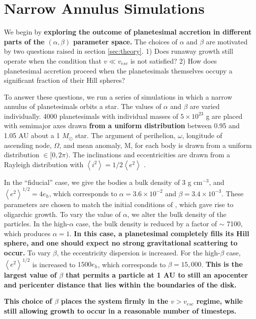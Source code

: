 \documentclass[twocolumn,linenumbers]{aastex63}
\begin{document}
\section{Narrow Annulus Simulations}\label{sec:narrow}

We begin by 
\textbf{exploring the outcome of planetesimal accretion in different parts of the $\left( \alpha, \beta \right)$
parameter space.} The choices of $\alpha$ and $\beta$ are motivated by two questions raised in section \ref{sec:theory}. 1) Does
runaway growth still operate when the condition that $v \ll v_{esc}$
is not satisfied? 2) How does planetesimal accretion proceed when the planetesimals themselves occupy a significant fraction of 
their Hill spheres?

To answer these questions, we run a series of simulations in which a
narrow annulus of planetesimals orbits a star. The values of $\alpha$
and $\beta$ are varied individually. 4000 planetesimals with
individual masses of $5 \times 10^{23}$ g are placed with semimajor
axes drawn \textbf{from a uniform distribution} between 0.95 and 1.05 AU about a 1 $M_{\odot}$
star. The argument of perihelion, $\omega$, longitude of ascending node,
$\Omega$, and mean anomaly, M, for each body is drawn from a uniform
distribution $\in [0, 2 \pi)$. The inclinations and eccentricities are drawn
from a Rayleigh distribution with
$\left< i^{2} \right> = 1/2 \left< e^{2} \right>$ \citep{ida93a}.

In the ``fiducial'' case, we give the bodies a bulk density of 3 g
cm$^{-3}$, and $\left< e^{2} \right>^{1/2} = 4 e_{h}$, which corresponds to $\alpha = 3.6 \times 10^{-2}$ and $\beta = 3.4 \times 
10^{-3}$. These parameters are chosen to match the initial conditions of \citet{kokubo98}, which gave rise to oligarchic growth. 
To vary the value of $\alpha$, we alter the bulk density of the particles. In the high-$\alpha$ case, the bulk density is reduced by 
a factor of $\sim$ 7100, which produces $\alpha = 1$. \textbf{In this case, a planetesimal completely fills its Hill sphere, and one should expect no strong gravitational scattering to occur.} To vary $\beta$, the eccentricity dispersion is increased. For the high-$
\beta$ case, $\left< e^{2} \right>^{1/2}$ is increased to $1500 e_{h}$, which corresponds to $\beta = 15,000$. \textbf{This is the largest value of $\beta$ that permits a particle at 1 AU to still an apocenter and pericenter distance that lies within the boundaries of the disk.}

\textbf{This choice of $\beta$ places the system firmly in the $v > v_{esc}$ regime, while still allowing growth to occur in a reasonable number of timesteps.}
\end{document}
